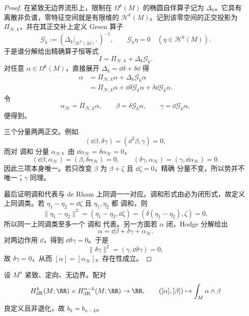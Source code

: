 \begin{proof}
在紧致无边界流形上，限制在 $\Omega^k(M)$ 的椭圆自伴算子记为 $\Delta_k$。它具有离散非负谱，零特征空间就是有限维的 $\mathcal H^k(M)$。记到该零空间的正交投影为 $\Pi_{\mathcal H,k}$，并在其正交补上定义 Green 算子
\[
\mathcal G_k:=\left(\Delta_k\big|_{\mathcal H^k(M)^\perp}\right)^{-1},
\qquad
\mathcal G_k\eta=0\quad(\eta\in\mathcal H^k(M)).
\]
于是谱分解给出精确算子恒等式
\[
I=\Pi_{\mathcal H,k}+\Delta_k\mathcal G_k.
\]
对任意 $\alpha\in\Omega^k(M)$，直接展开 $\Delta_k=\dd\delta+\delta\dd$ 得
\[
\begin{aligned}
\alpha
&=\Pi_{\mathcal H,k}\alpha+\Delta_k\mathcal G_k\alpha\\
&=\Pi_{\mathcal H,k}\alpha
+\dd\delta\mathcal G_k\alpha
+\delta\dd\mathcal G_k\alpha.
\end{aligned}
\]
令
\[
\alpha_{\mathcal H}=\Pi_{\mathcal H,k}\alpha,
\qquad
\beta=\delta\mathcal G_k\alpha,
\qquad
\gamma=\dd\mathcal G_k\alpha,
\]
便得到。

三个分量两两正交。例如
\[
(\dd\beta,\delta\gamma)
=(\dd^2\beta,\gamma)=0,
\]
而对 调和 分量 $\alpha_{\mathcal H}$，由 $\dd\alpha_{\mathcal H}=\delta\alpha_{\mathcal H}=0$，
\[
(\dd\beta,\alpha_{\mathcal H})=(\beta,\delta\alpha_{\mathcal H})=0,
\qquad
(\delta\gamma,\alpha_{\mathcal H})=(\gamma,\dd\alpha_{\mathcal H})=0.
\]
因此三项本身唯一。若只改变 $\beta$ 为 $\beta+\zeta$ 且 $\dd\zeta=0$，精确 分量不变，所以势并不唯一；$\gamma$ 同理。

最后证明调和代表与 de Rham 上同调一一对应。调和形式由必为闭形式，故定义上同调类。若 $\eta_1-\eta_2=\dd\zeta$ 且 $\eta_1,\eta_2$ 都 调和，则
\[
\|\eta_1-\eta_2\|^2
=(\eta_1-\eta_2,\dd\zeta)
=(\delta(\eta_1-\eta_2),\zeta)=0,
\]
所以同一上同调类至多一个 调和 代表。另一方面若 $\alpha$ 闭，Hodge 分解给出
\[
\alpha=\dd\beta+\delta\gamma+\alpha_{\mathcal H}.
\]
对两边作用 $\dd$，得到 $\dd\delta\gamma=0$。于是
\[
\|\delta\gamma\|^2
=(\gamma,\dd\delta\gamma)=0,
\]
故 $\delta\gamma=0$，从而 $[\alpha]=[\alpha_{\mathcal H}]$。存在性成立。
\end{proof}

\begin{theorem}
设 $M^n$ 紧致、定向、无边界。配对\[H^k_{\mathrm{dR}}(M;\RR)\times H^{n-k}_{\mathrm{dR}}(M;\RR)\to\RR,\qquad([\alpha],[\beta])\mapsto\int_M\alpha\wedge\beta\]良定义且非退化，故 $b_k=b_{n-k}$。
\end{theorem}

